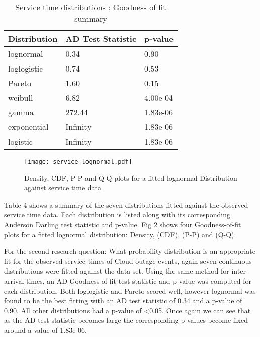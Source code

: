 \documentclass[5p]{elsarticle}
\begin{document}
\begin {table}
\caption {Service time distributions :  Goodness of fit summary} 
\begin{center}
\begin{tabular}{p{2.1cm} |  p{3.1cm} | p{1.3cm}} \hline \bf{Distribution} & \bf{AD Test Statistic} & \bf{p-value}
\\ \hline lognormal & 0.34 & 0.90
\\ loglogistic & 0.74 & 0.53
\\ Pareto & 1.60 & 0.15 
\\ weibull  & 6.82 & 4.00e-04 
\\ gamma & 272.44 & 1.83e-06	
\\ exponential & Infinity & 1.83e-06
\\ logistic & Infinity  & 1.83e-06	
\\ \hline
\end{tabular}
\end{center}
\end{table}

\begin{figure*}[]
\begin{center}
\texttt{[image: service\_lognormal.pdf]} 
\caption{Density, CDF, P-P and Q-Q plots for a fitted lognormal Distribution against service time data}
\end{center}
\label{fig:outagedistribution}
\end{figure*}


Table 4 shows a summary of the seven distributions fitted against the observed service time data. Each distribution is listed along with its corresponding Anderson Darling test statistic and p-value. Fig 2 shows four Goodness-of-fit plots for a fitted lognormal distribution: Density, (CDF), (P-P)  and (Q-Q).  

For the second research question: What probability distribution is an appropriate fit for the observed service times of Cloud outage events, again seven continuous distributions were fitted against the data set. Using the same method for inter-arrival times, an AD Goodness of fit test statistic and p value was computed for each distribution. Both loglogistic and Pareto scored well, however lognormal was found to be the best fitting with an AD test statistic of 0.34 and a p-value of 0.90. All other distributions had a p-value of \textless 0.05. Once again we can see that as the AD test statistic becomes large the corresponding p-values become fixed around a value of 1.83e-06.
\end{document}
